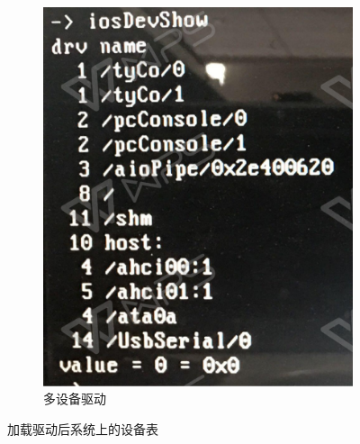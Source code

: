 \begin{figure}[h]
\begin{subfigure}[b]{0.4\textwidth}
  \includegraphics[width=\textwidth]{./graphics/iosDevShowM.pdf}
  \caption{多设备驱动}
  \end{subfigure}
\caption{加载驱动后系统上的设备表}\label{fig:加载驱动后系统上的设备表}
\end{figure}


